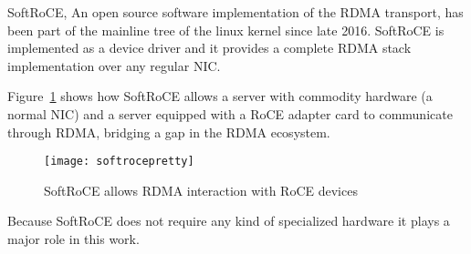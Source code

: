 SoftRoCE, An open source software implementation of the RDMA transport, has been part of the mainline tree of
the linux kernel since late 2016. SoftRoCE is implemented as a device driver and it provides a complete RDMA
stack implementation over any regular NIC\cite{softroce}.

Figure~\ref{fig:softroce} shows how SoftRoCE allows a server with commodity hardware (a normal NIC)
and a server equipped with a RoCE adapter card to communicate through RDMA, bridging a gap in the RDMA ecosystem.

\begin{figure}[h!]
  \centering
  \texttt{[image: softrocepretty]}
  \caption[SoftRoCE]{SoftRoCE allows RDMA interaction with RoCE devices\footnotemark}\label{fig:softroce}
\end{figure}


Because SoftRoCE does not require any kind of specialized hardware it plays a major role
in this work.








